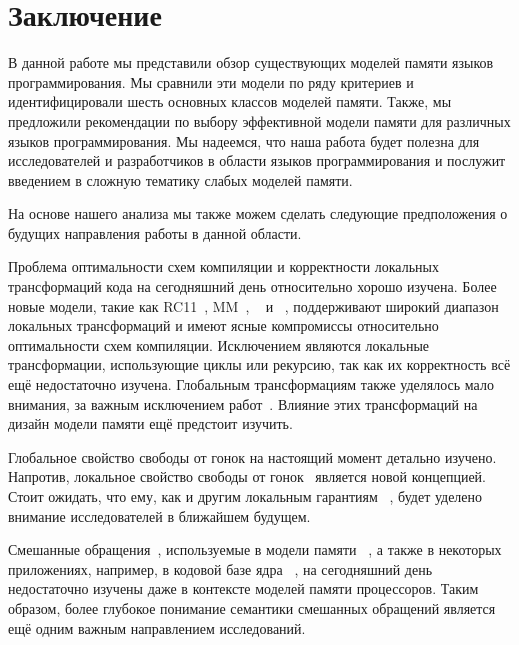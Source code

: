 \section{Заключение}
\label{sec:conclusion}

В данной работе мы представили обзор существующих моделей памяти языков программирования. 
Мы сравнили эти модели  по ряду критериев 
и идентифицировали шесть основных классов моделей памяти. 
Также, мы предложили рекомендации по выбору эффективной модели памяти 
для различных языков программирования. 
Мы надеемся, что наша работа будет полезна 
для исследователей и разработчиков в области языков программирования
и послужит введением в сложную тематику слабых моделей памяти. 


На основе нашего анализа мы также можем сделать следующие предположения 
о будущих направления работы в данной области. 

Проблема оптимальности схем компиляции и корректности локальных трансформаций кода 
на сегодняшний день относительно хорошо изучена.
Более новые модели, такие как 
RC11~\cite{Lahav-al:PLDI17}, \OCaml MM~\cite{Dolan-al:PLDI18},
\Promising~\cite{Kang-al:POPL17,Lee-al:PLDI20}
и \Weakestmo~\cite{Chakraborty-Vafeiadis:POPL19},
поддерживают широкий диапазон локальных трансформаций 
и имеют ясные компромиссы относительно оптимальности схем компиляции. 
Исключением являются  локальные трансформации, 
использующие  циклы или рекурсию, так как их корректность всё ещё недостаточно изучена. 
Глобальным трансформациям также уделялось мало внимания, за важным исключением работ~\cite{PichonPharabod-Sewell:POPL16, Lee-al:PLDI20}.
Влияние этих трансформаций на дизайн модели памяти 
ещё предстоит  изучить.

Глобальное свойство свободы от гонок на настоящий момент детально изучено. 
Напротив, локальное свойство свободы от гонок~\cite{Dolan-al:PLDI18}  
является новой концепцией. 
Стоит ожидать, что ему, как и другим локальным гарантиям~%
\cite{Dodds-al:ESOP18, Jagadeesan-al:OOPSLA2020, Cho-al:PLDI21}, 
будет уделено  внимание исследователей в ближайшем будущем. 

Смешанные обращения~\cite{Flur-al:POPL17}, 
используемые в модели памяти \JS~\cite{Watt-al:PLDI2020}, 
а также в некоторых приложениях, например, в кодовой базе 
ядра \Linux~\cite{Flur-al:POPL17},
на сегодняшний день недостаточно изучены 
даже в контексте моделей памяти процессоров. 
Таким образом, более глубокое понимание семантики смешанных обращений 
является ещё одним важным направлением исследований. 

